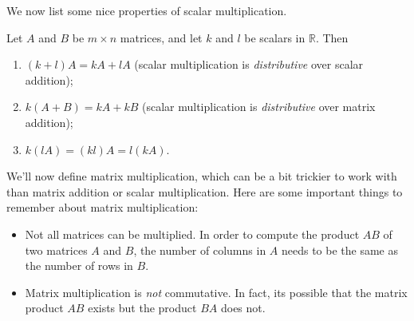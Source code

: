 \documentclass{ximera}
\begin{document}
We now list some nice properties of scalar multiplication.

\begin{proposition}
Let $A$ and $B$ be $m\times n$ matrices, and let $k$ and $l$ be scalars in $\mathbb{R}$. Then
\begin{enumerate}
\item $(k+l)A = kA+lA$ (scalar multiplication is \emph{distributive} over scalar addition);
\item $k(A+B)=kA+kB$ (scalar multiplication is \emph{distributive} over matrix addition);
\item $k(lA)=(kl)A = l(kA)$.
\end{enumerate}
\end{proposition}

We'll now define matrix multiplication, which can be a bit trickier to work with than matrix addition or scalar multiplication. Here are some important things to remember about matrix multiplication:
\begin{itemize}
\item Not all matrices can be multiplied. In order to compute the product $AB$ of two matrices $A$ and $B$, the number of columns in $A$ needs to be the same as the number of rows in $B$.
\item Matrix multiplication is \emph{not} commutative. In fact, its possible that the matrix product $AB$ exists but the product $BA$ does not.
\end{itemize}
\end{document}
